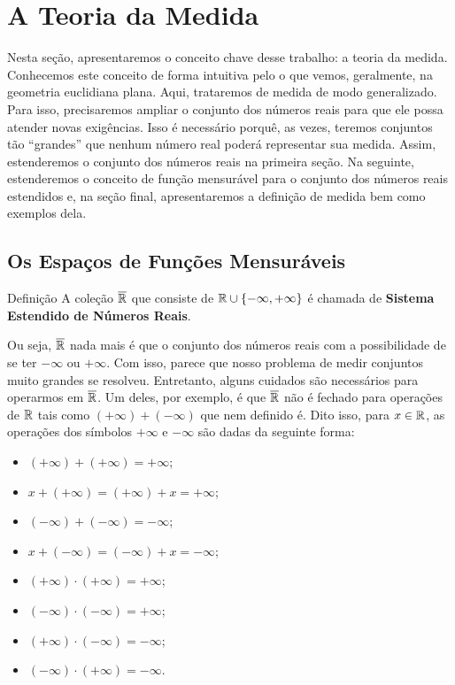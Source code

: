\chapter{A Teoria da Medida}
    Nesta seção, apresentaremos o conceito chave desse trabalho: a teoria da medida.
    Conhecemos este conceito de forma intuitiva pelo o que vemos, geralmente, na geometria euclidiana plana.
    Aqui, trataremos de medida de modo generalizado. 
    Para isso, precisaremos ampliar o conjunto dos números reais para que ele possa atender novas exigências.
    Isso é necessário porquê, as vezes, teremos conjuntos tão \enquote{grandes} que nenhum número real poderá representar sua medida. 
    Assim, estenderemos o conjunto dos números reais na primeira seção.
    Na seguinte, estenderemos o conceito de função mensurável para o conjunto dos números reais estendidos e, na seção final, apresentaremos a definição de medida bem como exemplos dela.
\section{Os Espaços de Funções Mensuráveis}

    \begin{env}{Definição}
    \label{def:reta-estendida}
        A coleção $\operatorname{\overline{\mathbb{R}}}$ que consiste de $\mathbb{R} \cup \{-\infty, +\infty\}$ é chamada de \textbf{Sistema Estendido de Números Reais}.
        \vspace{-0.2cm}
    \end{env}

    Ou seja, $\operatorname{\overline{\mathbb{R}}}$ nada mais é que o conjunto dos números reais com a possibilidade de se ter $-\infty$ ou $+\infty$.
    Com isso, parece que nosso problema de medir conjuntos muito grandes se resolveu.
    Entretanto, alguns cuidados são necessários para operarmos em $\operatorname{\overline{\mathbb{R}}}$.
    Um deles, por exemplo, é que $\operatorname{\overline{\mathbb{R}}}$ não é fechado para operações de $\mathbb{R}$ tais como $(+\infty) + (-\infty)$ que nem definido é.
    Dito isso, para $x \in \mathbb{R}$, as operações dos símbolos $+\infty$ e $-\infty$ são dadas da seguinte forma:
    \vspace{-0.4cm}
    \begin{multicols}{2}
        \begin{itemize}
            \item $(+ \infty) + (+ \infty)  = + \infty$;
            \item $x + (+ \infty) = (+ \infty) + x = + \infty$;
            \item $(- \infty) + (- \infty)  = - \infty$;
            \item $x + (- \infty) = (- \infty) + x = - \infty$;
            \item $(+ \infty)\cdot (+ \infty) =  +\infty $;
            \item $(- \infty)\cdot (- \infty) =  +\infty $;
            \item $(+ \infty)\cdot (- \infty) =  -\infty $;
            \item $(- \infty)\cdot (+ \infty) =  -\infty $.
        \end{itemize}
    \end{multicols}
	
